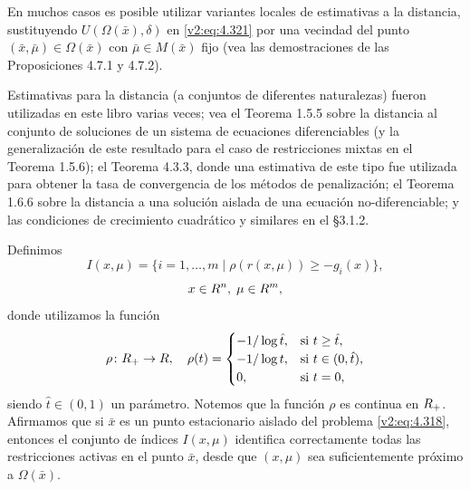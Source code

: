 En muchos casos es posible utilizar variantes locales de estimativas a la distancia, sustituyendo $U(\Omega(\bar{x}), \delta)$ en \eqref{v2:eq:4.321} por una vecindad del punto $(\bar{x}, \bar{\mu}) \in \Omega(\bar{x})$ con $\bar{\mu} \in M(\bar{x})$ fijo (vea las demostraciones de las Proposiciones 4.7.1 y 4.7.2).

Estimativas para la distancia (a conjuntos de diferentes naturalezas) fueron utilizadas en este libro varias veces; vea el Teorema 1.5.5 sobre la distancia al conjunto de soluciones de un sistema de ecuaciones diferenciables (y la generalización de este resultado para el caso de restricciones mixtas en el Teorema 1.5.6); el Teorema 4.3.3, donde una estimativa de este tipo fue utilizada para obtener la tasa de convergencia de los métodos de penalización; el Teorema 1.6.6 sobre la distancia a una solución aislada de una ecuación no-diferenciable; y las condiciones de crecimiento cuadrático y similares en el \S 3.1.2.

Definimos
\begin{equation}
    I(x, \mu) = \{i = 1, \dots, m \mid \rho(r(x, \mu)) \ge -g_i(x)\},
    \label{v2:eq:4.322}
\end{equation}
\[
    x \in R^n, \; \mu \in R^m,
\]
donde utilizamos la función
\begin{equation}
    \rho \colon R_+ \to R, \quad \rho(t) = \begin{cases}
        -1/\log \hat{t}, & \text{si } t \ge \hat{t}, \\
        -1/\log t, & \text{si } t \in (0, \hat{t}), \\
        0, & \text{si } t = 0,
    \end{cases}
    \label{v2:eq:4.323}
\end{equation}
siendo $\hat{t} \in (0, 1)$ un parámetro. Notemos que la función $\rho$ es continua en $R_+$. Afirmamos que si $\bar{x}$ es un punto estacionario aislado del problema \eqref{v2:eq:4.318}, entonces el conjunto de índices $I(x, \mu)$ identifica correctamente todas las restricciones activas en el punto $\bar{x}$, desde que $(x, \mu)$ sea suficientemente próximo a $\Omega(\bar{x})$.

